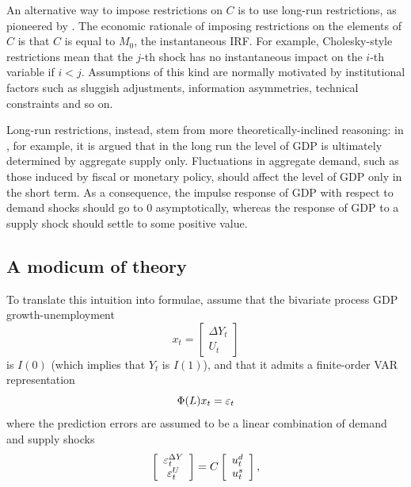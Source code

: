 \documentclass[a4paper,10pt]{article}
\newcommand{\PrE}[1]{\ensuremath \varepsilon_{#1}}
\newcommand{\StS}[1]{\ensuremath u_{#1}}
\newcommand{\VarSym}{\ensuremath \Phi}
\begin{document}
An alternative way to impose restrictions on $C$ is to use long-run
restrictions, as pioneered by \cite{BlanQuah1}. The economic
rationale of imposing restrictions on the elements of $C$ is that $C$
is equal to $M_0$, the instantaneous IRF. For example, Cholesky-style
restrictions mean that the $j$-th shock has no instantaneous impact on
the $i$-th variable if $i<j$. Assumptions of this kind are normally
motivated by institutional factors such as sluggish adjustments,
information asymmetries, technical constraints and so on.

Long-run restrictions, instead, stem from more theoretically-inclined
reasoning: in \cite{BlanQuah1}, for example, it is argued that in the
long run the level of GDP is ultimately determined by aggregate supply
only. Fluctuations in aggregate demand, such as those induced by
fiscal or monetary policy, should affect the level of GDP only in the
short term. As a consequence, the impulse response of GDP with respect
to demand shocks should go to 0 asymptotically, whereas the response
of GDP to a supply shock should settle to some positive value.

\subsection{A modicum of theory}
To translate this intuition into formulae, assume that the bivariate
process GDP growth-unemployment
\[
  x_t = \left[ \begin{array}{c} \Delta Y_t \\ U_t  \end{array}\right]
\]
is $I(0)$ (which implies that $Y_t$ is $I(1)$), and that it admits a
finite-order VAR representation
\[
  \VarSym(L) x_t = \PrE{t} 
\]
where the prediction errors are assumed to be a linear combination of
demand and supply shocks
\[
  \left[ \begin{array}{c} \PrE{t}^{\Delta Y} \\ \PrE{t}^U  \end{array}\right] 
  = 
  C \left[ \begin{array}{c} \StS{t}^d \\ \StS{t}^s  \end{array}\right] ,
\]
\end{document}
